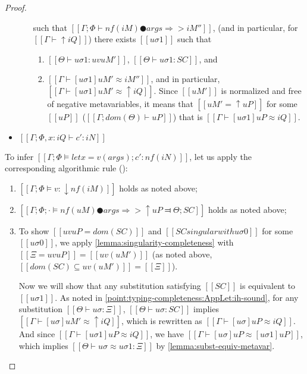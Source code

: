 \begin{proof}
\begin{caseof}
\begin{itemize}
\begin{enumerate}
                            such that $[[Γ; Φ ⊢ nf(iM) ● args ⇒> iM'']]$,
                            (and in particular, for $[[Γ ⊢ ↑iQ]]$)
                            there exists $[[uσ1]]$ such that 
                            \begin{enumerate}
                                \item 
                                    $[[ Θ  ⊢ uσ1 : uv uM' ]]$,
                                    $[[ Θ  ⊢ uσ1 : SC ]]$, and 
                                \item $[[Γ ⊢ [uσ1]uM' ≈ iM'']]$, and 
                                    in particular, $[[Γ ⊢ [uσ1]uM' ≈ ↑iQ]]$.
                                    Since $[[uM']]$ is
                                    normalized and free of 
                                    negative metavariables, it means that 
                                    $[[uM' = ↑uP]]$ for some $[[uP]]$ 
                                    ($[[Γ; dom(Θ) ⊢  uP]]$)
                                    that is $[[Γ ⊢ [uσ1]uP ≈ iQ]]$.
                            \end{enumerate}
                    \end{enumerate}
                \item $[[Γ; Φ, x:iQ ⊢ c' : iN]]$
            \end{itemize}

            To infer $[[Γ ; Φ ⊨ let x = v(args); c' : nf(iN)]]$, 
            let us apply the corresponding algorithmic rule 
            ():
            \begin{enumerate}
                \item $[[Γ ; Φ ⊨ v : ↓nf(iM)]]$ holds as noted above;

                \item $[[Γ; Φ ; · ⊨ nf(uM) ● args ⇒> ↑uP ⫤ Θ; SC]]$ holds as noted above;

                \item To show $[[uv uP = dom(SC)]]$ and 
                    $[[SC singular with uσ0]]$ for some $[[uσ0]]$,
                    we apply \cref{lemma:singularity-completeness}
                    with $[[Ξ = uv uP]] = [[uv(uM')]]$ (as noted above, $[[dom(SC) ⊆ uv(uM')]] = [[Ξ]]$).

                    Now we will show that any substitution satisfying $[[SC]]$ is equivalent to $[[uσ1]]$.
                    As noted in \ref{point:typing-completeness:AppLet:ih-sound},
                    for any substitution $[[Θ ⊢ uσ : Ξ]]$, $[[ Θ ⊢ uσ : SC ]]$ implies 
                    $[[Γ ⊢ [uσ]uM' ≈ ↑iQ]]$,
                    which is rewritten as $[[Γ ⊢ [uσ]uP ≈ iQ]]$.
                    And since $[[Γ ⊢ [uσ1]uP ≈ iQ]]$, 
                    we have $[[Γ ⊢ [uσ]uP ≈ [uσ1]uP]]$,
                    which implies $[[Θ ⊢ uσ ≈ uσ1 : Ξ]]$ by \cref{lemma:subst-equiv-metavar}.


\end{enumerate}
\end{caseof}
\end{proof}
